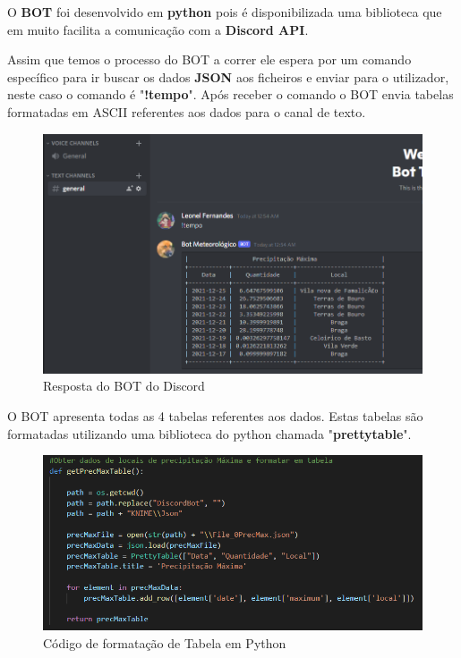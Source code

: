 O \textbf{BOT} foi desenvolvido em \textbf{python} pois é disponibilizada uma biblioteca que em muito facilita a comunicação com a \textbf{Discord API}.

Assim que temos o processo do BOT a correr ele espera por um comando específico para ir buscar os dados \textbf{JSON} aos ficheiros e enviar para o utilizador, neste caso o comando é "\textbf{!tempo}". Após receber o comando o BOT envia tabelas formatadas em ASCII referentes aos dados para o canal de texto.


\begin{figure}[H]
    \centering
    \includegraphics[scale=0.6]{imagens/Bot1.png}
    \caption{Resposta do BOT do Discord}
\end{figure}
\newpage
O BOT apresenta todas as 4 tabelas referentes aos dados. Estas tabelas são formatadas utilizando uma biblioteca do python chamada "\textbf{prettytable}".

\begin{figure}[H]
    \centering
    \includegraphics[scale=0.6]{imagens/formattablepython.png}
    \caption{Código de formatação de Tabela em Python}
\end{figure}

